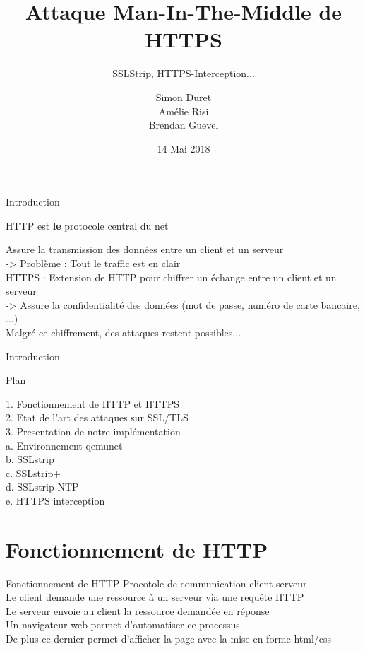\documentclass{beamer}
\title[Attaques sur HTTPS]{Attaque Man-In-The-Middle de HTTPS}
\subtitle{SSLStrip, HTTPS-Interception...}
\author[S. Duret - A. Risi - B. Guevel]{Simon Duret\\Amélie Risi\\Brendan Guevel}
\institute[]{Université de Bordeaux}
\date{14 Mai 2018}
\begin{document}
\begin{frame}
  \titlepage
\end{frame}

\begin{frame}{Introduction}
    {\Large \centerline{HTTP est \textbf{le} protocole central du net}}

    Assure la transmission des données entre un client et un serveur \\
    -> Problème : Tout le traffic est en clair \\
    HTTPS : Extension de HTTP pour chiffrer un échange entre un client et un serveur \\
    -> Assure la confidentialité des données (mot de passe, numéro de carte bancaire, ...) \\

    Malgré ce chiffrement, des attaques restent possibles...

\end{frame}

\begin{frame}{Introduction}
    {\Large \centerline{Plan}}

    1. Fonctionnement de HTTP et HTTPS \\
    2. Etat de l'art des attaques sur SSL/TLS \\
    3. Presentation de notre implémentation \\
        a. Environnement qemunet \\
        b. SSLstrip \\
        c. SSLstrip+ \\
        d. SSLstrip NTP \\
        e. HTTPS interception \\

\end{frame}

\section{Fonctionnement de HTTP}

\begin{frame}{Fonctionnement de HTTP}
    Procotole de communication client-serveur \\
    Le client demande une ressource à un serveur via une requête HTTP \\
    Le serveur envoie au client la ressource demandée en réponse \\
    Un navigateur web permet d'automatiser ce processus \\
    De plus ce dernier permet d'afficher la page avec la mise en forme html/css

\end{frame}
\end{document}
